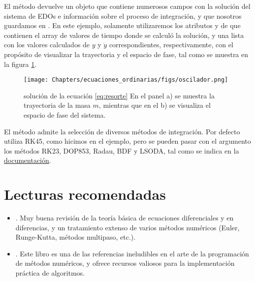  El método  devuelve un objeto que contiene numerosos campos con la solución del sistema de EDOs e información sobre el proceso de integración, y que nosotros guardamos en . En este ejemplo, solamente utilizaremos los atributos  y  de  que contienen el array de valores de tiempo donde se calculó la solución, y una lista con los valores calculados de $y$ y $\dot{y}$ correspondientes, respectivamente, con el propósito de visualizar la trayectoria y el espacio de fase, tal como se muestra en la figura \ref{fig:sol-resorte}.
 \begin{figure}[t]
 \centering
 \texttt{[image: Chapters/ecuaciones\_ordinarias/figs/oscilador.png]}
 \caption{solución de la ecuación \ref{eq:resorte} En el panel a) se muestra la trayectoria de la masa $m$, mientras que en el b) se visualiza el espacio de fase del sistema.}
 \label{fig:sol-resorte}
\end{figure}

El método  admite la selección de diversos métodos de integración. Por defecto utiliza RK45, como hicimos en el ejemplo, pero se pueden pasar con el argumento  los métodos RK23, DOP853, Radau, BDF y LSODA, tal como se indica en la \href{https://docs.scipy.org/doc/scipy/reference/generated/scipy.integrate.solve_ivp.html}{documentación}.


\section{Lecturas recomendadas}
\begin{itemize}
 \item {}. Muy buena revisión de la teoría básica de ecuaciones diferenciales y en diferencias, y un tratamiento extenso de varios métodos numéricos (Euler, Runge-Kutta, métodos multipaso, etc.).
 \item {}. Este libro es una de las referencias ineludibles en el arte de la programación de métodos numéricos, y ofrece recursos valiosos para la implementación práctica de algoritmos.
\end{itemize}




